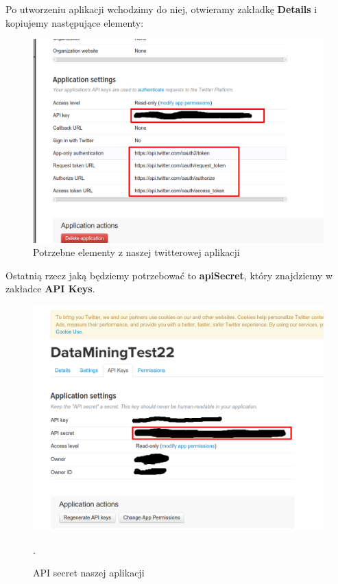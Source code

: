 \documentclass[12pt,a4paper]{report}
\begin{document}
Po utworzeniu aplikacji wchodzimy do niej, otwieramy zakładkę \textbf{Details} i kopiujemy następujące elementy: 
\begin{figure}[H]
\begin{center}
\includegraphics[scale=0.2]{pictures/Twitter3.png}
\caption{Potrzebne elementy z naszej twitterowej aplikacji}
\end{center}
\end{figure}
Ostatnią rzecz jaką będziemy potrzebować to \textbf{apiSecret}, który znajdziemy w zakładce \textbf{API Keys}.
\begin{figure}[H]
\begin{center}
\includegraphics[scale=0.2]{pictures/Twitter4.png}
\caption{API secret naszej aplikacji}.
\end{center}
\end{figure}
\end{document}
